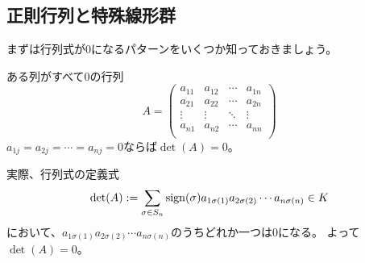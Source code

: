 \subsection{正則行列と特殊線形群}

まずは行列式が0になるパターンをいくつか知っておきましょう。
\begin{example}
  ある列がすべて0の行列
  \[
    A=\begin{pmatrix}
      a_{11} & a_{12} & \cdots & a_{1n}\\
      a_{21} & a_{22} & \cdots & a_{2n}\\
      \vdots & \vdots & \ddots & \vdots\\
      a_{n1} & a_{n2} & \cdots & a_{nn}\\
    \end{pmatrix}
  \]
  $a_{1j}=a_{2j}=\cdots=a_{nj}=0$ならば$\det(A)=0$。

  実際、行列式の定義式
  \[
    \det(A):=\sum_{\sigma\in S_n}{\rm sign}(\sigma)a_{1\sigma(1)}a_{2\sigma(2)}\cdots a_{n\sigma(n)}\in K
  \]
  において、$a_{1\sigma(1)}a_{2\sigma(2)}\cdots a_{n\sigma(n)}$のうちどれか一つは0になる。
  よって$\det(A)=0$。
\end{example}


